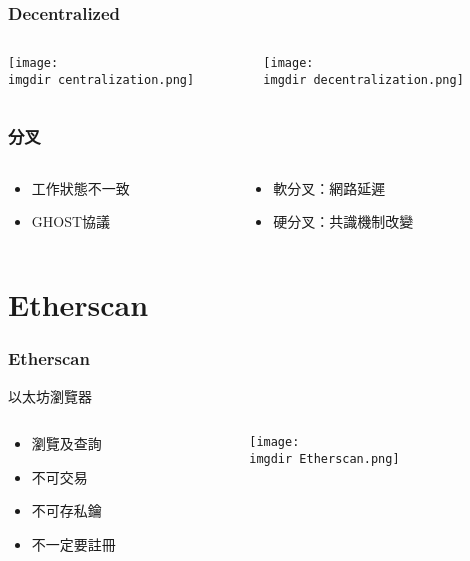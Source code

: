 \documentclass[xcolor=dvipsnames]{beamer}
\begin{document}
\begin{frame}
\frametitle{Decentralized}
\begin{columns}
    \begin{column}{0.5\textwidth} 
      \texttt{[image: \\imgdir centralization.png]}
    \end{column}
    \pause
    \begin{column}{0.5\textwidth} 
      \texttt{[image: \\imgdir decentralization.png]}
    \end{column}
  \end{columns}
\end{frame}
\begin{frame}
\frametitle{分叉}
\pause
\begin{columns}
    \begin{column}{0.5\textwidth} %
\begin{block}{
\begin{itemize}
    \item 工作狀態不一致
    \item GHOST協議
\end{itemize}}
\end{block}
    \end{column}
    \pause
    \begin{column}{0.5\textwidth} %
\begin{itemize}
    \item 軟分叉：網路延遲
    \item 硬分叉：共識機制改變
\end{itemize}
    \end{column}
\end{columns}
\pause
\begin{figure}
    \label{fig:Forks}
    \end{figure}
\end{frame}

\section{Etherscan}

\begin{frame}
\frametitle{Etherscan}
以太坊瀏覽器
    \pause
\begin{columns}
    \begin{column}{0.3\textwidth} %
\begin{itemize}
    \item 瀏覽及查詢
    \pause
    \item 不可交易
    \pause
    \item 不可存私鑰
    \pause
    \item 不一定要註冊
    \pause
\end{itemize}
    \end{column}
    \begin{column}{0.7\textwidth} %
      \texttt{[image: \\imgdir Etherscan.png]}
    \end{column}
  \end{columns}
\end{frame}
\end{document}
